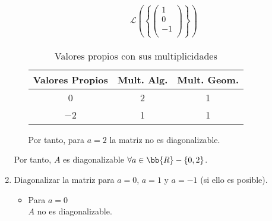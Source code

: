 \begin{ejercicio}
\begin{enumerate}
\begin{itemize}
\begin{equation*}
\begin{split}
               \mathcal{L}\left(\left\{ \left(\begin{array}{c}
                    1 \\
                    0 \\
                    -1 \\
               \end{array}\right)
               \right\}\right)
           \end{split}\end{equation*}
           \begin{table}[H]
                \centering
                \begin{tabular}{c|c|c}
                    Valores Propios & Mult. Alg. & Mult. Geom. \\ \hline 
                    0 & 2 & 1\\
                    $-$2 & 1 & 1\\
                \end{tabular}
                \caption{Valores propios con sus multiplicidades}
            \end{table}
            Por tanto, para $a=2$ la matriz no es diagonalizable.
       \end{itemize} 

       Por tanto, $A$ es diagonalizable $\forall a \in \bb{R}-\{0,2\}$.
       

        \item Diagonalizar la matriz para $a=0$, $a=1$ y $a=-1$ (si ello es posible).
        \begin{itemize}
            \item Para $a=0$\\
            $A$ no es diagonalizable.


\end{itemize}
\end{enumerate}
\end{ejercicio}
